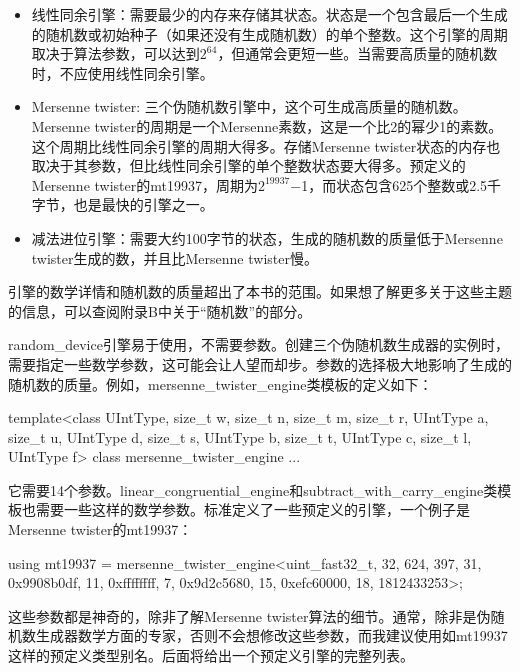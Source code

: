 \begin{itemize}
\item
线性同余引擎：需要最少的内存来存储其状态。状态是一个包含最后一个生成的随机数或初始种子（如果还没有生成随机数）的单个整数。这个引擎的周期取决于算法参数，可以达到$2^{64}$，但通常会更短一些。当需要高质量的随机数时，不应使用线性同余引擎。

\item
Mersenne twister: 三个伪随机数引擎中，这个可生成高质量的随机数。Mersenne twister的周期是一个Mersenne素数，这是一个比2的幂少1的素数。这个周期比线性同余引擎的周期大得多。存储Mersenne twister状态的内存也取决于其参数，但比线性同余引擎的单个整数状态要大得多。预定义的Mersenne twister的mt19937，周期为$2^{19937}$−1，而状态包含625个整数或2.5千字节，也是最快的引擎之一。

\item
减法进位引擎：需要大约100字节的状态，生成的随机数的质量低于Mersenne twister生成的数，并且比Mersenne twister慢。
\end{itemize}

引擎的数学详情和随机数的质量超出了本书的范围。如果想了解更多关于这些主题的信息，可以查阅附录B中关于“随机数”的部分。

random\_device引擎易于使用，不需要参数。创建三个伪随机数生成器的实例时，需要指定一些数学参数，这可能会让人望而却步。参数的选择极大地影响了生成的随机数的质量。例如，mersenne\_twister\_engine类模板的定义如下：

\begin{cpp}
template<class UIntType, size_t w, size_t n, size_t m, size_t r,
                UIntType a, size_t u, UIntType d, size_t s,
                UIntType b, size_t t, UIntType c, size_t l, UIntType f>
    class mersenne_twister_engine {...}
\end{cpp}

它需要14个参数。linear\_congruential\_engine和subtract\_with\_carry\_engine类模板也需要一些这样的数学参数。标准定义了一些预定义的引擎，一个例子是Mersenne twister的mt19937：

\begin{cpp}
using mt19937 = mersenne_twister_engine<uint_fast32_t, 32, 624, 397, 31,
    0x9908b0df, 11, 0xffffffff, 7, 0x9d2c5680, 15, 0xefc60000, 18,
    1812433253>;
\end{cpp}

这些参数都是神奇的，除非了解Mersenne twister算法的细节。通常，除非是伪随机数生成器数学方面的专家，否则不会想修改这些参数，而我建议使用如mt19937这样的预定义类型别名。后面将给出一个预定义引擎的完整列表。







